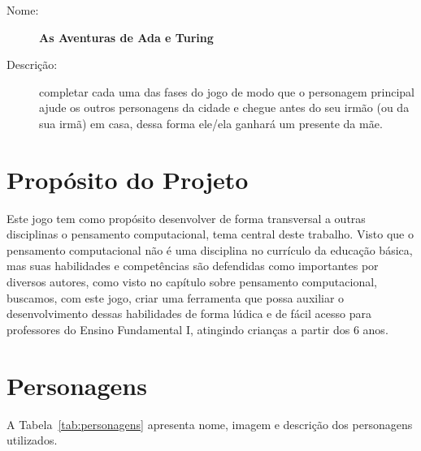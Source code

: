 \begin{description}
    \item[Nome:] \textbf{As Aventuras de Ada e Turing}
    \item[Descrição:] completar cada uma das fases do jogo de modo que o personagem principal ajude os outros personagens da cidade e chegue antes do seu irmão (ou da sua irmã) em casa, dessa forma ele/ela ganhará um presente da mãe.
\end{description}

\section{Propósito do Projeto} \label{sec:proposito}

Este jogo tem como propósito desenvolver de forma transversal a outras disciplinas o pensamento computacional, tema central deste trabalho. Visto que o pensamento computacional não é uma disciplina no currículo da educação básica, mas suas habilidades e competências são defendidas como importantes por diversos autores, como visto no capítulo sobre pensamento computacional, buscamos, com este jogo, criar uma ferramenta que possa auxiliar o desenvolvimento dessas habilidades de forma lúdica e de fácil acesso para professores do Ensino Fundamental I, atingindo crianças a partir dos 6 anos.

\section{Personagens} \label{sec:personagens}

A Tabela~\ref{tab:personagens} apresenta nome, imagem e descrição dos personagens utilizados.

